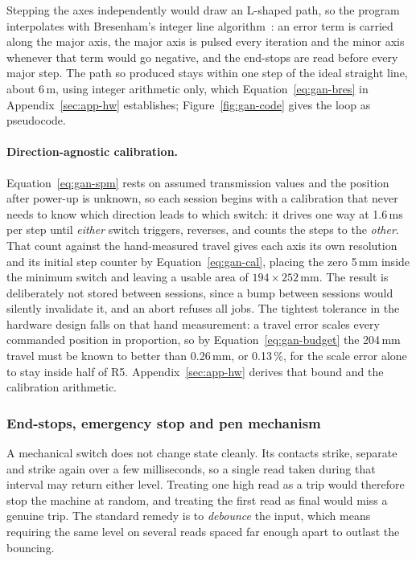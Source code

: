 Stepping the axes independently would draw an L-shaped path, so the program interpolates with Bresenham's integer line algorithm~\cite{bresenham1965}: an error term is carried along the major axis, the major axis is pulsed every iteration and the minor axis whenever that term would go negative, and the end-stops are read before every major step.
The path so produced stays within one step of the ideal straight line, about 6\,\textmu m, using integer arithmetic only, which Equation~\ref{eq:gan-bres} in Appendix~\ref{sec:app-hw} establishes; Figure~\ref{fig:gan-code} gives the loop as pseudocode.

\paragraph{Direction-agnostic calibration.}
\label{sec:gan-calib}
Equation~\ref{eq:gan-spm} rests on assumed transmission values and the position after power-up is unknown, so each session begins with a calibration that never needs to know which direction leads to which switch: it drives one way at 1.6\,ms per step until \emph{either} switch triggers, reverses, and counts the steps to the \emph{other}.
That count against the hand-measured travel gives each axis its own resolution and its initial step counter by Equation~\ref{eq:gan-cal}, placing the zero 5\,mm inside the minimum switch and leaving a usable area of $194\times252$\,mm.
The result is deliberately not stored between sessions, since a bump between sessions would silently invalidate it, and an abort refuses all jobs.
The tightest tolerance in the hardware design falls on that hand measurement: a travel error scales every commanded position in proportion, so by Equation~\ref{eq:gan-budget} the 204\,mm travel must be known to better than 0.26\,mm, or 0.13\,\%, for the scale error alone to stay inside half of R5.
Appendix~\ref{sec:app-hw} derives that bound and the calibration arithmetic.


\subsubsection{End-stops, emergency stop and pen mechanism}
\label{sec:gan-stop}

A mechanical switch does not change state cleanly. Its contacts strike, separate and strike again over a few milliseconds, so a single read taken during that interval may return either level. Treating one high read as a trip would therefore stop the machine at random, and treating the first read as final would miss a genuine trip. The standard remedy is to \emph{debounce} the input, which means requiring the same level on several reads spaced far enough apart to outlast the bouncing.

